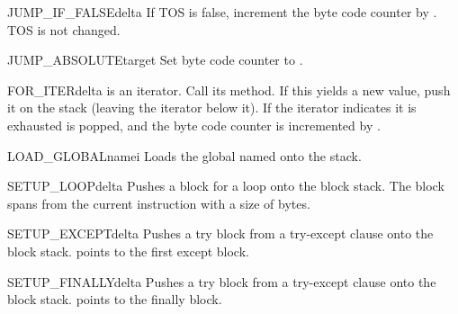 \begin{opcodedesc}{JUMP_IF_FALSE}{delta}
If TOS is false, increment the byte code counter by .  TOS
is not changed. 
\end{opcodedesc}

\begin{opcodedesc}{JUMP_ABSOLUTE}{target}
Set byte code counter to .
\end{opcodedesc}

\begin{opcodedesc}{FOR_ITER}{delta}
 is an iterator.  Call its  method.  If this
yields a new value, push it on the stack (leaving the iterator below
it).  If the iterator indicates it is exhausted   is
popped, and the byte code counter is incremented by .
\end{opcodedesc}



\begin{opcodedesc}{LOAD_GLOBAL}{namei}
Loads the global named  onto the stack.
\end{opcodedesc}


\begin{opcodedesc}{SETUP_LOOP}{delta}
Pushes a block for a loop onto the block stack.  The block spans
from the current instruction with a size of  bytes.
\end{opcodedesc}

\begin{opcodedesc}{SETUP_EXCEPT}{delta}
Pushes a try block from a try-except clause onto the block stack.
 points to the first except block.
\end{opcodedesc}

\begin{opcodedesc}{SETUP_FINALLY}{delta}
Pushes a try block from a try-except clause onto the block stack.
 points to the finally block.
\end{opcodedesc}

